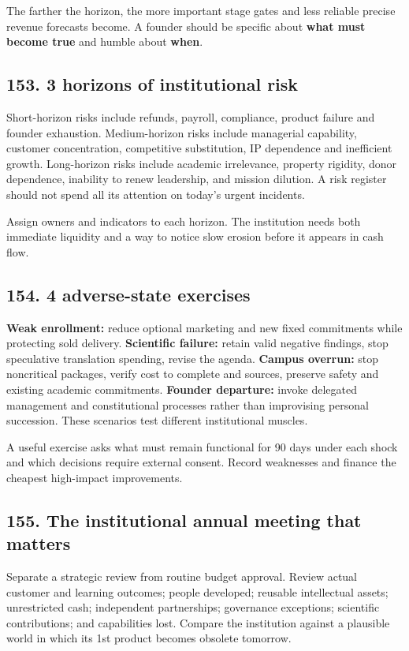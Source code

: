 The farther the horizon, the more important stage gates and less reliable precise revenue forecasts become. A founder should be specific about \textbf{what must become true} and humble about \textbf{when}.

\subsection{153. 3 horizons of institutional risk}

Short-horizon risks include refunds, payroll, compliance, product failure and founder exhaustion. Medium-horizon risks include managerial capability, customer concentration, competitive substitution, IP dependence and inefficient growth. Long-horizon risks include academic irrelevance, property rigidity, donor dependence, inability to renew leadership, and mission dilution. A risk register should not spend all its attention on today's urgent incidents.

Assign owners and indicators to each horizon. The institution needs both immediate liquidity and a way to notice slow erosion before it appears in cash flow.

\subsection{154. 4 adverse-state exercises}

\textbf{Weak enrollment:} reduce optional marketing and new fixed commitments while protecting sold delivery. \textbf{Scientific failure:} retain valid negative findings, stop speculative translation spending, revise the agenda. \textbf{Campus overrun:} stop noncritical packages, verify cost to complete and sources, preserve safety and existing academic commitments. \textbf{Founder departure:} invoke delegated management and constitutional processes rather than improvising personal succession. These scenarios test different institutional muscles.

A useful exercise asks what must remain functional for 90 days under each shock and which decisions require external consent. Record weaknesses and finance the cheapest high-impact improvements.

\subsection{155. The institutional annual meeting that matters}

Separate a strategic review from routine budget approval. Review actual customer and learning outcomes; people developed; reusable intellectual assets; unrestricted cash; independent partnerships; governance exceptions; scientific contributions; and capabilities lost. Compare the institution against a plausible world in which its 1st product becomes obsolete tomorrow.

